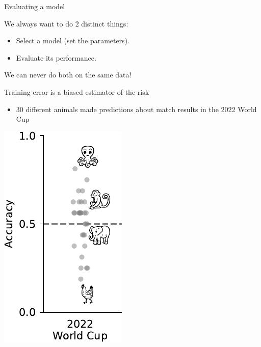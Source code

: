 \documentclass[presentation,mathserif,table]{beamer}
\begin{document}
\begin{frame}[label={sec:org9d7de17}]{Evaluating a model}
\begin{block}{We always want to do 2 distinct things:}
\begin{itemize}
\item Select a model (set the parameters).
\item Evaluate its performance.
\end{itemize}

\vfill
\end{block}

\begin{structureenv} %
We can never do both on the same data!
\end{structureenv}
\end{frame}
\begin{frame}[label={sec:orgbca3c01}]{Training error is a biased estimator of the risk}
\begin{itemize}
\item 30 different animals made predictions about match results in the 2022 World Cup
\end{itemize}
\begin{center}
\includegraphics[height=.65 \textheight]{figures/generated/select_evaluate/select_evaluate_1.pdf}
\end{center}
\end{frame}
\end{document}
